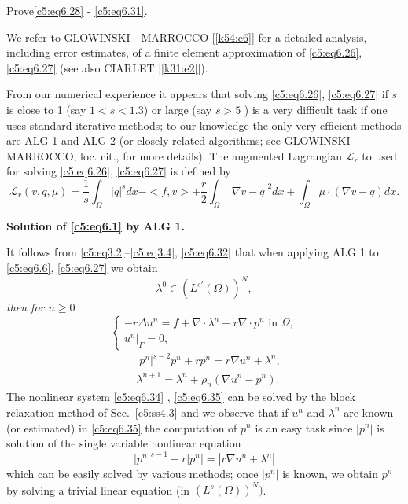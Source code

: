 \begin{exercise}\label{c5:exer6.1}%
 Prove\pageoriginale   \eqref{c5:eq6.28} - \eqref{c5:eq6.31}. 
\end{exercise}

We refer to GLOWINSKI - MARROCCO [\ref{k54:e6}] for a detailed
analysis, including error estimates, of a finite element approximation
of \eqref{c5:eq6.26}, \eqref{c5:eq6.27} (see also CIARLET [\ref{k31:e2}]).  

From our numerical experience it appears that solving 
\eqref{c5:eq6.26}, \eqref{c5:eq6.27} if $s$ is close to 1 (say $1 < s 
<1. 3$) or large (say $s >5$ ) is a very difficult task  if one uses 
standard iterative methods; to our knowledge the only very efficient 
methods are ALG 1 and ALG 2  (or closely related algorithms; see 
GLOWINSKI-MARROCCO, loc.  cit.,  for more details).  The augmented 
Lagrangian $\mathscr{L}_r$ to used for solving \eqref{c5:eq6.26}, 
\eqref{c5:eq6.27} is defined by         
\begin{equation}
\mathscr{L}_r (v, q, \mu ) = \frac{1}{s} \int_\Omega |q|^s dx  - <f, v> 
+ \frac{r}{2}\int_\Omega | \nabla v-q|^2 dx + \int_\Omega \mu 
\cdot (\nabla v-q) dx.  \tag{6.32}\label{c5:eq6.32}  
\end{equation}

\noindent
\textbf{Solution of \eqref{c5:eq6.1} by ALG 1.}

It follows from \eqref{c5:eq3.2}--\eqref{c5:eq3.4}, \eqref{c5:eq6.32} 
that when applying ALG 1 to \eqref{c5:eq6.6}, \eqref{c5:eq6.27} we obtain  
\begin{equation}
\lambda^0 \in (L^{s'} (\Omega ))^N, \tag{6.33}\label{c5:eq6.33}
\end{equation}
\textit{then for $n\geq 0$}
\begin{equation}
\begin{cases}
-r\Delta u^n = f + \nabla \cdot \lambda^n - r \nabla 
\cdot p^n \text{ in }\Omega, \\ 
u^n |_\Gamma = 0,\tag{6.34}\label{c5:eq6.34}
\end{cases}
\end{equation}
\begin{align*}
&|p^n|^{s-2}p^n+ rp^n = r \nabla u^n + \lambda^n, \tag{6.35}\label{c5:eq6.35}\\
&\lambda^{n+1} = \lambda^n + \rho_n (\nabla u^n
  -p^n). \tag{6.36}\label{c5:eq6.36} 
\end{align*}
The nonlinear  system \eqref{c5:eq6.34} , \eqref{c5:eq6.35} can be 
solved by the block relaxation method of Sec.~\ref{c5:ss4.3} and we observe 
that if $u^n$ and $\lambda^n$ are known  (or estimated) in 
\eqref{c5:eq6.35} the computation of $p^n$ is an easy task since 
$|p^n|$ is solution of the single variable nonlinear equation     
\begin{equation}
|p^n|^{s-1} + r |p^n| = | r \nabla u^n + \lambda^n | 
\tag{6.37}\label{c5:eq6.37} 
\end{equation}\pageoriginale  
which can be easily solved by various methods; once $| p^n |$ is known, 
we obtain $p^n$ by solving a trivial linear equation (in $(L^s (\Omega ))^N)$.  

